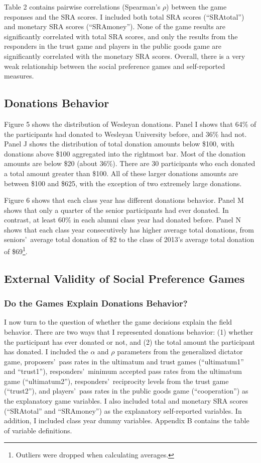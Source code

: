 \documentclass[12pt]{article}
\begin{document}
Table 2 contains pairwise correlations (Spearman\rq s \(\rho\)) between the game responses and the SRA scores. I included both total SRA scores (``SRAtotal'') and monetary SRA scores (``SRAmoney''). None of the game results are significantly correlated with total SRA scores, and only the results from the responders in the trust game and players in the public goods game are significantly correlated with the monetary SRA scores. Overall, there is a very weak relationship between the social preference games and self-reported measures. 

\subsection{Donations Behavior}

Figure 5 shows the distribution of Wesleyan donations. Panel I shows that 64\% of the participants had donated to Wesleyan University before, and 36\% had not. Panel J shows the distribution of total donation amounts below \$100, with donations above \$100 aggregated into the rightmost bar. Most of the donation amounts are below \$20 (about 36\%). There are 30 participants who each donated a total amount greater than \$100. All of these larger donations amounts are between \$100 and \$625, with the exception of two extremely large donations.

Figure 6 shows that each class year has different donations behavior. Panel M shows that only a quarter of the senior participants had ever donated. In contrast, at least 60\% in each alumni class year had donated before. Panel N shows that each class year consecutively has higher average total donations, from seniors\rq \ average total donation of \$2 to the class of 2013\rq s average total donation of \$69\footnote{Outliers were dropped when calculating averages.}.

\subsection{External Validity of Social Preference Games}

\subsubsection{Do the Games Explain Donations Behavior?}
I now turn to the question of whether the game decisions explain the field behavior. There are two ways that I represented donations behavior: (1) whether the participant has ever donated or not, and (2) the total amount the participant has donated. I included the \(\alpha\) and \(\rho\) parameters from the generalized dictator game, proposers\rq \ pass rates in the ultimatum and trust games (``ultimatum1'' and ``trust1''), responders\rq \ minimum accepted pass rates from the ultimatum game (``ultimatum2''), responders\rq \ reciprocity levels from the trust game (``trust2''), and players\rq \ pass rates in the public goods game (``cooperation'') as the explanatory game variables. I also included total and monetary SRA scores (``SRAtotal'' and ``SRAmoney'') as the explanatory self-reported variables. In addition, I included class year dummy variables. Appendix B contains the table of variable definitions. 
\end{document}
